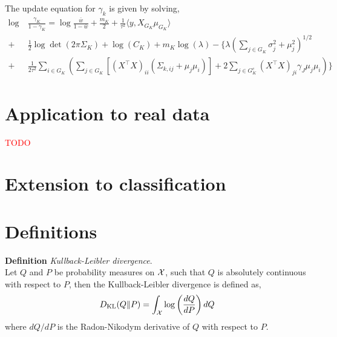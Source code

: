 \documentclass[12pt]{article}
\renewcommand{\red}[1]{\textcolor{red}{#1}}
\begin{document}
The update equation for $\gamma_k$ is given by solving,
\begin{equation} \label{eq:QD_update_gamma} 
\begin{aligned}
    \log &\ \frac{\gamma_K}{1-\gamma_K} = 
    \log \frac{\bar{w}}{1-\bar{w}}
+ 
    \frac{m_K}{2}  
+
    \frac{1}{\tau^2} \langle y, X_{G_K} \mu_{G_K} \rangle  \\
+ &\ 
    \frac{1}{2} \log \det \left( 2 \pi \Sigma_K \right)
+
    \log(C_K )
+
    m_K \log (\lambda)
-
\Bigg\{ 
    \lambda \left( \sum_{j \in G_K} 
	\sigma_j^2 + \mu_j^2
    \right)^{1/2}  \\
+ &\
    \frac{1}{2\tau^2}
    \sum_{i \in G_K} \left( 
    \sum_{j \in G_K} \left[
	(X^\top X)_{ii} (\Sigma_{k, ij} + \mu_j \mu_i)
    \right]
+
    2 \sum_{j \in G_K^c} (X^\top X)_{ji} 
	\gamma_{J} \mu_j \mu_i
    \right )
\Bigg\}
\end{aligned}
\end{equation}





\newpage
\section{Application to real data}

\red{TODO}

\newpage
\section{Extension to classification}


\newpage


\appendix
{}


\section{Definitions}
\textbf{Definition} \textit{Kullback-Leibler divergence}.\\ Let $Q$ and $P$ be probability measures on $\mathcal{X}$, such that $ Q $ is absolutely continuous with respect to $P$, then the Kullback-Leibler divergence is defined as,
\begin{equation}\label{eq:kl}
D_\text{KL}(Q \| P) = \int_{\mathcal{X}} \log \left( \frac{dQ}{dP} \right) dQ
\end{equation}
where $dQ/dP$ is the Radon-Nikodym derivative of $Q$ with respect to $P$.
\end{document}
